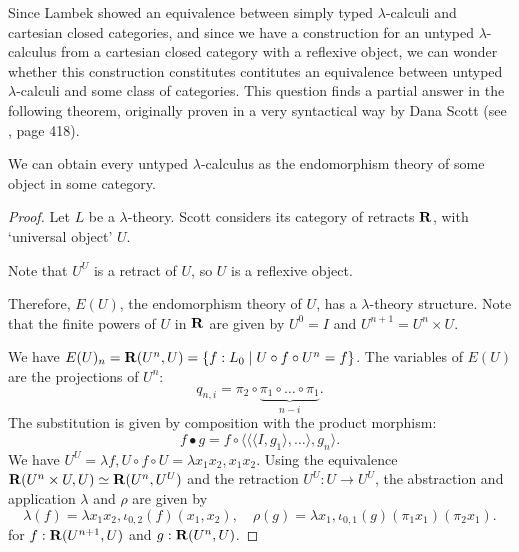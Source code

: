Since Lambek showed an equivalence between simply typed $ \lambda $-calculi and cartesian closed categories, and since we have a construction for an untyped $ \lambda $-calculus from a cartesian closed category with a reflexive object, we can wonder whether this construction constitutes contitutes an equivalence between untyped $ \lambda $-calculi and some class of categories. This question finds a partial answer in the following theorem, originally proven in a very syntactical way by Dana Scott (see \cite{curry}, page 418).
\begin{theorem}
  We can obtain every untyped $ \lambda $-calculus as the endomorphism theory of some object in some category.
\end{theorem}
\begin{proof}
  Let $ L $ be a $ \lambda $-theory. Scott considers its category of retracts $ \mathbf{R} $, with `universal object' $ U $.

  Note that $ U^U $ is a retract of $ U $, so $ U $ is a reflexive object.

  Therefore, $ E(U) $, the endomorphism theory of $ U $, has a $ \lambda $-theory structure. Note that the finite powers of $ U $ in $ \mathbf{R} $ are given by $ U^0 = I $ and $ U^{n + 1} = U^n \times U $.

  We have $ E(U)_n = \mathbf{R}(U^n, U) = \{ f: L_0 \mid U \circ f \circ U^n = f \} $. The variables of $ E(U) $ are the projections of $ U^n $:
  \[ q_{n, i} = \pi_2 \circ \underbrace{\pi_1 \circ \dots \circ \pi_1}_{n - i}. \]
  The substitution is given by composition with the product morphism:
  \[ f \bullet g = f \circ \langle \langle \langle I, g_1 \rangle, \dots \rangle, g_n \rangle. \]
  We have $ U^U = \lambda f, U \circ f \circ U = \lambda x_1 x_2, x_1 x_2 $. Using the equivalence $ \mathbf{R}(U^n \times U, U) \simeq \mathbf{R}(U^n, U^U) $ and the retraction $ U^U: U \to U^U $, the abstraction and application $ \lambda $ and $ \rho $ are given by
  \[ \lambda(f) = \lambda x_1 x_2, \iota_{0, 2}(f)(x_1, x_2), \quad \rho(g) = \lambda x_1, \iota_{0, 1}(g) (\pi_1 x_1) (\pi_2 x_1). \]
  for $ f: \mathbf{R}(U^{n + 1}, U) $ and $ g: \mathbf{R}(U^n, U) $.


\end{proof}
